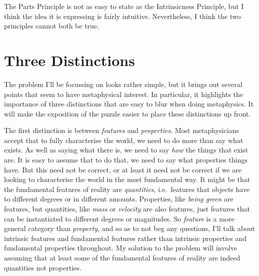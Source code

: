 \documentclass[
  11pt,
  letterpaper,
  DIV=11,
  numbers=noendperiod,
  twoside]{scrartcl}
\begin{document}
The Parts Principle is not as easy to state as the Intrinsicness
Principle, but I think the idea it is expressing is fairly intuitive.
Nevertheless, I think the two principles cannot both be true.

\section{Three Distinctions}\label{three-distinctions}

The problem I'll be focussing on looks rather simple, but it brings out
several points that seem to have metaphysical interest. In particular,
it highlights the importance of three distinctions that are easy to blur
when doing metaphysics. It will make the exposition of the puzzle easier
to place these distinctions up front.

The first distinction is between \emph{features} and \emph{properties}.
Most metaphysicians accept that to fully characterise the world, we need
to do more than say what exists. As well as saying what there is, we
need to say \emph{how} the things that exist are. It is easy to assume
that to do that, we need to say what properties things have. But this
need not be correct, or at least it need not be correct if we are
looking to characterise the world in the most fundamental way. It might
be that the fundamental features of reality are \emph{quantities},
i.e.~features that objects have to different degrees or in different
amounts. Properties, like \emph{being green} are features, but
quantities, like \emph{mass} or \emph{velocity} are also features, just
features that can be instantiated to different degrees or magnitudes. So
\emph{feature} is a more general category than \emph{property}, and so
as to not beg any questions, I'll talk about intrinsic features and
fundamental features rather than intrinsic properties and fundamental
properties throughout. My solution to the problem will involve assuming
that at least some of the fundamental features of reality are indeed
quantities not properties.
\end{document}
